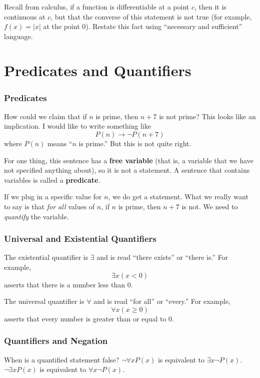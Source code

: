 \documentclass[11pt, compress]{beamer}
\newcommand{\terminology}[1]{\textbf{#1}}\newcommand{\lt}{<}
\newcommand{\imp}{\rightarrow}
\begin{document}
\begin{frame}
\frametitle{}
\begin{example}[0.2.9]Recall from calculus, if a function is differentiable at a point \(c\), then it is continuous at \(c\), but that the converse of this statement is not true (for example, \(f(x) = |x|\) at the point 0). Restate this fact using ``necessary and sufficient'' language.
\end{example}
\end{frame}
 


\section{Predicates and Quantifiers}
\begin{frame}
\frametitle{Predicates}
  How could we claim that if \(n\) is prime, then \(n+7\) is not prime? This looks like an implication. I would like to write something like%
\begin{equation*}
P(n) \imp \neg P(n+7)
\end{equation*}
where \(P(n)\) means ``\(n\) is prime.'' But this is not quite right.
 
\pause \vfill 

For one thing, this sentence has a \terminology{free variable} (that is, a variable that we have not specified anything about), so it is not a statement.  A sentence that contains variables is called a \terminology{predicate}.
 
\pause \vfill 

If we plug in a specific value for \(n\), we do get a statement. What we really want to say is that \emph{for all} values of \(n\), if \(n\) is prime, then \(n+7\) is not. We need to \emph{quantify} the variable.
\end{frame}
 
\begin{frame}
\frametitle{Universal and Existential Quantifiers}
 The existential quantifier is \(\exists\) and is read ``there exists'' or ``there is.'' For example,%
\begin{equation*}
\exists x (x \lt 0)
\end{equation*}
asserts that there is a number less than 0.
 
\pause \vfill 

The universal quantifier is \(\forall\) and is read ``for all'' or ``every.'' For example,%
\begin{equation*}
\forall x (x \ge 0)
\end{equation*}
asserts that every number is greater than or equal to 0.
\end{frame}
 
\begin{frame}
\frametitle{Quantifiers and Negation}
 When is a quantified statement false?
 \(\neg \forall x P(x)\) is equivalent to \(\exists x \neg P(x)\).
 \(\neg \exists x P(x)\) is equivalent to \(\forall x \neg P(x)\).
\end{frame}
 
\end{document}
